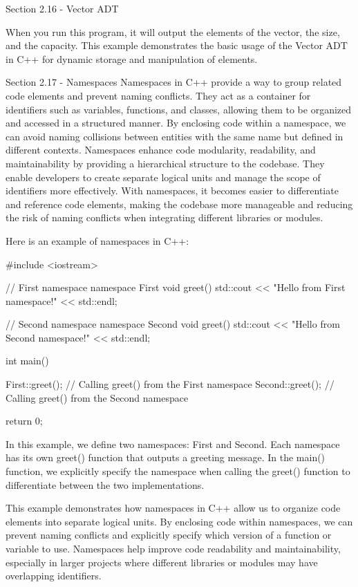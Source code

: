 \begin{notes}{Section 2.16 - Vector ADT}
\begin{highlight}
        When you run this program, it will output the elements of the vector, the size, and the capacity. This example demonstrates the basic usage of the Vector ADT in C++ for dynamic storage and manipulation of elements.
    \end{highlight}
\end{notes}

\begin{notes}{Section 2.17 - Namespaces}
    Namespaces in C++ provide a way to group related code elements and prevent naming conflicts. They act as a container for identifiers such as variables, functions, and classes, allowing them to be organized and accessed in a structured manner. By enclosing code within a namespace, we can avoid naming collisions between entities with 
    the same name but defined in different contexts. Namespaces enhance code modularity, readability, and maintainability by providing a hierarchical structure to the codebase. They enable developers to create separate logical units and manage the scope of identifiers more effectively. With namespaces, it becomes easier to differentiate 
    and reference code elements, making the codebase more manageable and reducing the risk of naming conflicts when integrating different libraries or modules.
    
    \begin{highlight}
        Here is an example of namespaces in C++:
    \begin{code}[C++]
    #include <iostream>

    // First namespace
    namespace First {
        void greet() {
            std::cout << "Hello from First namespace!" << std::endl;
        }
    }
    
    // Second namespace
    namespace Second {
        void greet() {
            std::cout << "Hello from Second namespace!" << std::endl;
        }
    }
    
    int main() {
        First::greet();   // Calling greet() from the First namespace
        Second::greet();  // Calling greet() from the Second namespace
    
        return 0;
    }
    \end{code}
        In this example, we define two namespaces: First and Second. Each namespace has its own greet() function that outputs a greeting message. In the main() function, we explicitly specify the namespace when calling the greet() function to differentiate between the two implementations.
    
        This example demonstrates how namespaces in C++ allow us to organize code elements into separate logical units. By enclosing code within namespaces, we can prevent naming conflicts and explicitly specify which version of a function or variable to use. Namespaces help improve code readability and maintainability, 
        especially in larger projects where different libraries or modules may have overlapping identifiers.
    \end{highlight}
\end{notes}

